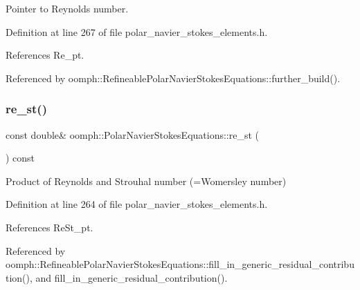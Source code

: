 Pointer to Reynolds number. 



Definition at line 267 of file polar\+\_\+navier\+\_\+stokes\+\_\+elements.\+h.



References Re\+\_\+pt.



Referenced by oomph\+::\+Refineable\+Polar\+Navier\+Stokes\+Equations\+::further\+\_\+build().

\mbox{\label{classoomph_1_1PolarNavierStokesEquations_ac539e938a5a877e708e2af0d84ca4edb}} 
\subsubsection{\texorpdfstring{re\+\_\+st()}{re\_st()}}
{\footnotesize\ttfamily const double\& oomph\+::\+Polar\+Navier\+Stokes\+Equations\+::re\+\_\+st (\begin{DoxyParamCaption}{ }\end{DoxyParamCaption}) const\hspace{0.3cm}{\ttfamily [inline]}}



Product of Reynolds and Strouhal number (=Womersley number) 



Definition at line 264 of file polar\+\_\+navier\+\_\+stokes\+\_\+elements.\+h.



References Re\+St\+\_\+pt.



Referenced by oomph\+::\+Refineable\+Polar\+Navier\+Stokes\+Equations\+::fill\+\_\+in\+\_\+generic\+\_\+residual\+\_\+contribution(), and fill\+\_\+in\+\_\+generic\+\_\+residual\+\_\+contribution().

\mbox{\label{classoomph_1_1PolarNavierStokesEquations_ad65b2a598827ace886f48f9c5b278ed6}} 
